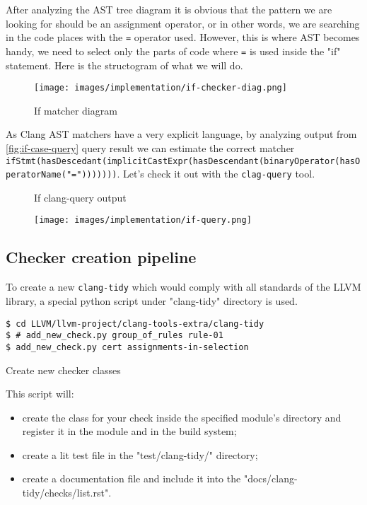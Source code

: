 After analyzing the AST tree diagram it is obvious that the pattern we are looking for should be an assignment operator, or in other words, we are searching in the code places with the \lstinline{=} operator used. However, this is where AST becomes handy, we need to select only the parts of code where \lstinline{=} is used inside the "if" statement. Here is the structogram of what we will do.


\begin{figure}[H]
	\centering
	\caption{If matcher diagram}
	\texttt{[image: images/implementation/if-checker-diag.png]}
	\label{fig:if-case-diagram}
\end{figure}

As Clang AST matchers have a very explicit language, by analyzing output from \ref{fig:if-case-query} query result we can estimate the correct matcher \lstinline|ifStmt(hasDescedant(implicitCastExpr(hasDescendant(binaryOperator(hasOperatorName("=")))))))|. Let's check it out with the \lstinline{clag-query} tool.

\begin{figure}[H]
	\centering
	\caption{If clang-query output}
	\texttt{[image: images/implementation/if-query.png]}
	\label{fig:if-case-diagram}
\end{figure}


\subsection{Checker creation pipeline}

To create a new \lstinline{clang-tidy} which would comply with all standards of the LLVM library, a special python script under "clang-tidy" directory is used. 

\begin{listing}[H]
\begin{verbatim}
$ cd LLVM/llvm-project/clang-tools-extra/clang-tidy
$ # add_new_check.py group_of_rules rule-01
$ add_new_check.py cert assignments-in-selection
\end{verbatim}
\caption{Create new checker classes}
\end{listing}

This script will:
\begin{itemize}
    \item create the class for your check inside the specified module's directory and
    register it in the module and in the build system;
    \item create a lit test file in the "test/clang-tidy/" directory;
    \item create a documentation file and include it into the
    "docs/clang-tidy/checks/list.rst".
\end{itemize}

